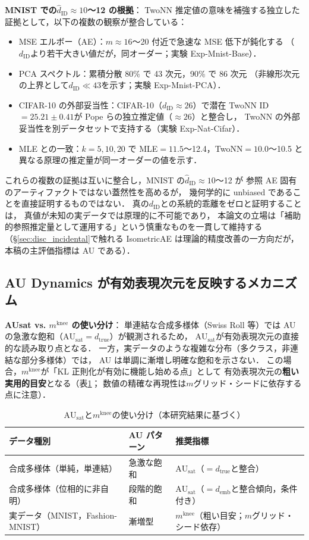 \documentclass[11pt,a4paper]{jsarticle}
\newcommand{\dtrue}{d_{\mathrm{true}}}
\newcommand{\AUsat}{\mathrm{AU}_{\mathrm{sat}}}
\newcommand{\mknee}{m^{\mathrm{knee}}}
\newcommand{\demb}{d_{\mathrm{emb}}}
\begin{document}
\textbf{MNIST での$\hat{d}_\mathrm{ID} \approx 10$〜12 の根拠}：
TwoNN 推定値の意味を補強する独立した証拠として，以下の複数の観察が整合している：
\begin{itemize}
  \item MSE エルボー（AE）：$m \approx 16$〜20 付近で急速な MSE 低下が鈍化する
        （$d_\mathrm{ID}$より若干大きい値だが，同オーダー；実験 Exp-Mnist-Base）．
  \item PCA スペクトル：累積分散 80\% で 43 次元，90\% で 86 次元
        （非線形次元の上界として$d_\mathrm{ID} \ll 43$を示す；実験 Exp-Mnist-PCA）．
  \item CIFAR-10 の外部妥当性：CIFAR-10（$d_\mathrm{ID} \approx 26$）で潜在 TwoNN ID$=25.21\pm0.41$が
        Pope ら\cite{pope2021intrinsic}の独立推定値（$\approx26$）と整合し，
        TwoNN の外部妥当性を別データセットで支持する（実験 Exp-Nat-Cifar）．
  \item MLE との一致：$k=5,10,20$ で MLE$=11.5$〜12.4，TwoNN$=10.0$〜10.5 と
        異なる原理の推定量が同一オーダーの値を示す．
\end{itemize}
これらの複数の証拠は互いに整合し，MNIST の$\hat{d}_\mathrm{ID} \approx 10$〜12 が
参照 AE 固有のアーティファクトではない蓋然性を高めるが，
幾何学的に unbiased であることを直接証明するものではない．
真の$d_\mathrm{ID}$との系統的乖離をゼロと証明することは，
真値が未知の実データでは原理的に不可能であり，
本論文の立場は「補助的参照推定量として運用する」という慎重なものを一貫して維持する
（§\ref{sec:disc_incidental}で触れる IsometricAE は理論的精度改善の一方向だが，本稿の主評価指標は AU である）．

\subsection{AU Dynamics が有効表現次元を反映するメカニズム}\label{sec:disc_au_dynamics}

\textbf{AUsat vs. $\mknee$ の使い分け}：
単連結な合成多様体（Swiss Roll 等）では AU の急激な飽和（$\AUsat = \dtrue$）が観測されるため，
$\AUsat$が有効表現次元の直接的な読み取り点となる．
一方，実データのような複雑な分布（多クラス，非連結な部分多様体）では，
AU は単調に漸増し明確な飽和を示さない．
この場合，$\mknee$が「KL 正則化が有効に機能し始める点」として
有効表現次元の\textbf{粗い実用的目安}となる（表\ref{tab:au_comparison}；
数値の精確な再現性は$m$グリッド・シードに依存する点に注意）．

\begin{table}[H]
\centering
\caption{$\AUsat$と$\mknee$の使い分け（本研究結果に基づく）}
\label{tab:au_comparison}
\small
\begin{tabular}{lll}
\toprule
データ種別 & AU パターン & 推奨指標 \\
\midrule
合成多様体（単純，単連結） & 急激な飽和 & $\AUsat$（$= \dtrue$と整合） \\
合成多様体（位相的に非自明） & 段階的飽和 & $\AUsat$（$= \demb$と整合傾向，条件付き） \\
実データ（MNIST，Fashion-MNIST） & 漸増型 & $\mknee$（粗い目安；$m$グリッド・シード依存） \\
\bottomrule
\end{tabular}
\end{table}
\end{document}

